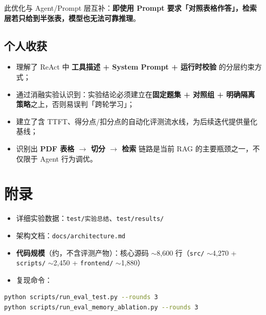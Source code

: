 \documentclass[11pt,a4paper]{ctexart}
\begin{document}
此优化与 Agent/Prompt 层互补：\textbf{即使用 Prompt 要求「对照表格作答」，检索层若只给到半张表，模型也无法可靠推理}。

\subsection{个人收获}

\begin{itemize}[nosep]
  \item 理解了 ReAct 中 \textbf{工具描述 + System Prompt + 运行时校验} 的分层约束方式；
  \item 通过消融实验认识到：实验结论必须建立在\textbf{固定题集 + 对照组 + 明确隔离策略}之上，否则易误判「跨轮学习」；
  \item 建立了含 TTFT、得分点/扣分点的自动化评测流水线，为后续迭代提供量化基线；
  \item 识别出 \textbf{PDF 表格 $\rightarrow$ 切分 $\rightarrow$ 检索} 链路是当前 RAG 的主要瓶颈之一，不仅限于 Agent 行为调优。
\end{itemize}

\section*{附录}

\begin{itemize}[nosep]
  \item 详细实验数据：\texttt{test/实验总结}、\texttt{test/results/}
  \item 架构文档：\texttt{docs/architecture.md}
  \item \textbf{代码规模}（约，不含评测产物）：核心源码 $\sim$8,600 行（\texttt{src/} $\sim$4,270 + \texttt{scripts/} $\sim$2,450 + \texttt{frontend/} $\sim$1,880）
  \item 复现命令：
\end{itemize}

\begin{lstlisting}[language=bash]
python scripts/run_eval_test.py --rounds 3
python scripts/run_eval_memory_ablation.py --rounds 3
\end{lstlisting}
\end{document}
